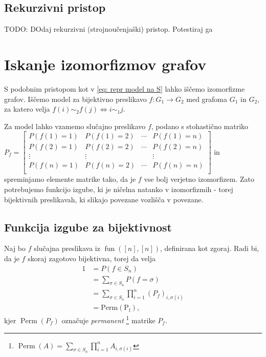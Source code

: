 \documentclass[mat2, tisk]{fmfdelo}
\newcommand{\TODO}[1]{{\color{blue} TODO: #1}}
\newcommand{\fun}{\operatorname{fun}}
\newcommand{\funnn}[1]{\fun([#1], [#1])}
\begin{document}
\subsection{Rekurzivni pristop}

\TODO{DOdaj rekurzivni (strojnoučenjaški) pristop. Potestiraj ga}

\section{Iskanje izomorfizmov grafov}
S podobnim pristopom kot v \ref{eq: repr model na S} lahko iščemo izomorfizme grafov. Iščemo model za bijektivno preslikavo $f \colon G_1 \to G_2$ med grafoma $G_1$ in $G_2$, za katero velja $f(i) \sim_2 f(j) \iff i \sim_1 j$.

Za model lahko vzamemo slučajno preslikavo $f$, podano s stohastično matriko $P_f = \begin{bmatrix}
            P(f(1) = 1) & P(f(1) = 2) & \dotsm & P(f(1) = n) \\
        P(f(2) = 1) & P(f(2) = 2) & \dotsm & P(f(2) = n) \\
        \vdots & \vdots & & \vdots \\
        P(f(n) = 1) & P(f(n) = 2) & \dotsm & P(f(n) = n) \\
\end{bmatrix} $ in spreminjamo elemente matrike tako, da je $f $ vse bolj verjetno izomorfizem. Zato potrebujemo funkcijo izgube, ki je ničelna natanko v izomorfizmih - torej bijektivnih preslikavah, ki slikajo povezane vozlišča v povezane. 
\subsection{Funkcija izgube za bijektivnost}
Naj bo $f$ slučajna preslikava iz $\funnn{n}$, definirana kot zgoraj. Radi bi, da je $f$ skoraj zagotovo bijektivna, torej da velja 
\begin{align*}
    1 &= P(f \in S_n) \\
    &= \sum_{\sigma  \in S_n} P(f =  \sigma) \\
    &= \sum_{\sigma  \in S_n} \prod_{i=1}^n (P_f)_{i, \sigma(i)} \\
    &= \operatorname{Perm(P_f)},
\end{align*}
kjer $\operatorname{Perm}(P_f)$ označuje \emph{permanent} \footnote{$\operatorname{Perm}(A) = \sum_{\sigma  \in S_n} \prod_{i=1}^n A_{i, \sigma(i)}$} matrike $P_f$.
\end{document}
